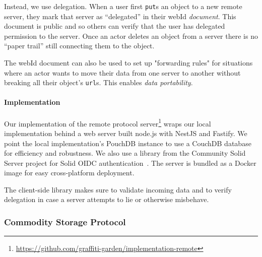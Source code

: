 Instead, we use delegation. When a user first \texttt{put}s an object
to a new remote server, they mark that server as ``delegated'' in their
webId \emph{document}. This document is public and so others can verify
that the user has delegated permission to the server.
Once an actor deletes an object from a server there is no
``paper trail'' still connecting them to the object.

The webId document can also be used to set up "forwarding rules" for
situations where an actor wants to move their data from one server to
another without breaking all their object's \texttt{url}s.
This enables \emph{data portability}.





\paragraph{Implementation}

Our implementation of the remote protocol server\footnote{
    \url{https://github.com/graffiti-garden/implementation-remote}
} wraps our local implementation behind
a web server built node.js with NestJS and Fastify.
We point the local implementation's PouchDB instance
to use a CouchDB database for efficiency and robustness.
We also use a library from the Community Solid Server project
for Solid OIDC authentication~\cite{communitysolidserver}.
The server is bundled as a Docker image for easy
cross-platform deployment.

The client-side library makes sure to validate
incoming data and to verify delegation in case a server attempts
to lie or otherwise misbehave.

\subsubsection{Commodity Storage Protocol}
\label{above-and-below:commodity-storage-protocol}

